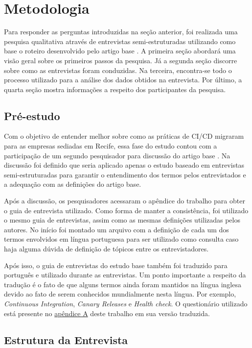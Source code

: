 
\section{Metodologia}

Para responder as perguntas introduzidas na seção anterior, foi realizada uma pesquisa qualitativa através de entrevistas semi-estruturadas utilizando como base o roteiro desenvolvido pelo artigo base \cite{empiricalStudy2016}. A primeira seção abordará uma visão geral sobre os primeiros passos da pesquisa.  Já a segunda seção discorre sobre como as entrevistas foram conduzidas. Na terceira, encontra-se todo o processo utilizado para a análise dos dados obtidos na entrevista. Por último, a quarta seção mostra informações a respeito dos participantes da pesquisa.


\subsection{Pré-estudo}

Com o objetivo de entender melhor sobre como as práticas de CI/CD migraram para as empresas sediadas em Recife, essa fase do estudo contou com a participação de um segundo pesquisador para discussão do artigo base \cite{empiricalStudy2016}. Na discussão foi definido que seria aplicado apenas o estudo baseado em entrevistas semi-estruturadas para garantir o entendimento dos termos pelos entrevistados e a adequação com as definições do artigo base. 

Após a discussão, os pesquisadores acessaram o apêndice do trabalho para obter o guia de entrevista utilizado. Como forma de manter a consistência, foi utilizado o mesmo guia de entrevistas, assim como as mesmas definições utilizadas pelos autores. No início foi montado um arquivo com a definição de cada um dos termos envolvidos em língua portuguesa para ser utilizado como consulta caso haja alguma dúvida de definição de tópicos entre os entrevistadores.

Após isso, o guia de entrevistas do estudo base também foi traduzido para português e utilizado durante as entrevistas. Um ponto importante a respeito da tradução é o fato de que alguns termos ainda foram mantidos na língua inglesa devido ao fato de serem conhecidos mundialmente nesta língua. Por exemplo, \emph{Continuous Integration}, \emph{Canary Releases} e \emph{Health check}. O questionário utilizado está presente no \hyperlink{questionario}{apêndice A} deste trabalho em sua versão traduzida.

\subsection{Estrutura da Entrevista}

